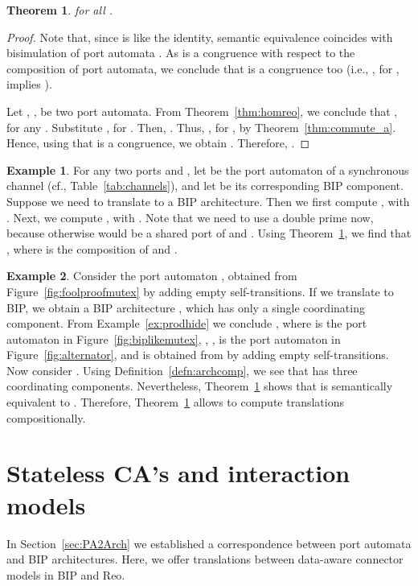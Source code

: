 \documentclass[submission,copyright,creativecommons,hidelinks]{eptcs}
\theoremstyle{plain} \newtheorem{theorem}{Theorem}
\theoremstyle{definition}
\newtheorem{example}{Example}
\theoremstyle{remark}
\newcommand\xqed[1]{\leavevmode\unskip\penalty9999 \hbox{}\nobreak\hfill
  \quad\hbox{#1}}
\newcommand\tri{\xqed{}}
\newcommand{\defn}[1]{Definition~\ref{defn:#1}}
\newcommand{\fig}[2][]{Figure~\ref{fig:#2}\ensuremath{#1}}
\newcommand{\tab}[1]{Table~\ref{tab:#1}}
\newcommand{\ex}[1]{Example~\ref{ex:#1}}
\newcommand{\secn}[1]{Section~\ref{sec:#1}}
\newcommand{\thm}[1]{Theorem~\ref{thm:#1}}
\begin{document}
\begin{theorem}
\label{thm:hombip}
 for all .
\end{theorem}

\begin{proof}
Note that, since  is like the identity, semantic equivalence  coincides with bisimulation  of port automata \cite{BSAR06}. As  is a congruence with respect to the composition  of port automata, we conclude that  is a congruence too (i.e., , for , implies ). 

Let , , be two port automata. From \thm{homreo}, we conclude that
, for any . Substitute , for . Then,
. Thus, , for , by \thm{commute_a}. Hence, using that  is a congruence, we obtain . Therefore, .
\end{proof}

\begin{example}
	For any two ports  and , let  be the port automaton of a synchronous channel (cf., \tab{channels}), and let  be its corresponding BIP component. Suppose we need to translate  to a BIP architecture. Then we first compute , with . Next, we compute , with . Note that we need to use a double prime now, because otherwise  would be a shared port of  and . Using \thm{hombip}, we find that , where  is the composition of  and .
\end{example}

\begin{example}
Consider the port automaton , obtained from \fig{foolproofmutex} by adding empty self-transitions. If we translate  to BIP, we obtain a BIP architecture , which has only a single coordinating component. From \ex{prodhide} we conclude , where  is the port automaton in \fig{biplikemutex}, , , is the port automaton in \fig{alternator}, and  is obtained from  by adding empty self-transitions. Now consider . Using \defn{archcomp}, we see that  has three coordinating components. Nevertheless, \thm{hombip} shows that  is semantically equivalent to . Therefore, \thm{hombip} allows to compute translations compositionally.
\tri\end{example}




\section{Stateless CA's and interaction models}
\label{sec:CA2BIPconn}

In \secn{PA2Arch} we established a correspondence between port automata and BIP architectures. Here, we offer translations between data-aware connector models in BIP and Reo.
\end{document}

